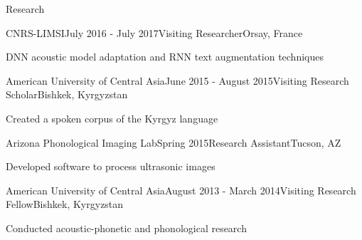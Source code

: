 \documentclass{resume} %
\begin{document}


\vspace{.25cm}

\begin{rSection}{Research}

\begin{rSubsection}{CNRS-LIMSI}{July 2016 - July 2017}{Visiting Researcher}{Orsay, France}
\item DNN acoustic model adaptation and RNN text augmentation techniques
\end{rSubsection}

\begin{rSubsection}{American University of Central Asia}{June 2015 - August 2015}{Visiting Research Scholar}{Bishkek, Kyrgyzstan}
\item Created a spoken corpus of the Kyrgyz language
\end{rSubsection}

\begin{rSubsection}{Arizona Phonological Imaging Lab}{Spring 2015}{Research Assistant}{Tucson, AZ}
\item Developed software to process ultrasonic images
\end{rSubsection}

\begin{rSubsection}{American University of Central Asia}{August 2013 - March 2014}{Visiting Research Fellow}{Bishkek, Kyrgyzstan}
\item Conducted acoustic-phonetic and phonological research
\end{rSubsection}



\end{rSection}
\end{document}
